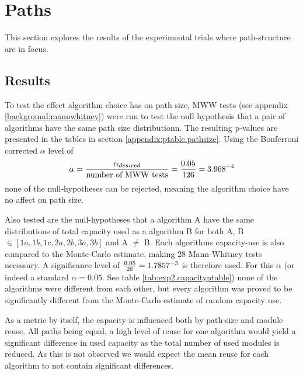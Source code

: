 \section{Paths}
This section explores the results of the experimental trials where path-structure are in focus. 

\subsection{Results}
To test the effect algorithm choice has on path size, MWW tests (see appendix \ref{background:mannwhitney}) were run to test the null hypothesis that a pair of algorithms have the same path size distributionn. The resulting p-values are presented in the tables in section \ref{appendix:ptable.pathsize}. Using the Bonferroni corrected \(\alpha\) level of 
\begin{equation*}
    \alpha=\frac{\alpha_{desired}}{\text{number of MWW tests}}=\frac{0.05}{126}=3.968\time 10^{-4}
\end{equation*}
none of the null-hypotheses can be rejected, meaning the algorithm choice have no affect on path size. 

Also tested are the null-hypotheses that a algorithm A have the same distributions of total capacity used as a algorithm B for both A, B \(\in [1a, 1b, 1c, 2a, 2b, 3a, 3b]\) and A \(\neq\) B. Each algorithms capacity-use is also compared to the Monte-Carlo estimate, making 28 Mann-Whitney tests necessary. A significance level of \(\frac{0.05}{28}=1.7857\time 10^{-3}\) is therefore used. For this \(\alpha\) (or indeed a standard \(\alpha=0.05\). See table \ref{tab:exp2.capacityptable}) none of the algorithms were different from each other, but every algorithm was proved to be significantly different from the Monte-Carlo estimate of random capacity use. 

As a metric by itself, the capacity is influenced both by path-size and module reuse. All paths being equal, a high level of reuse for one algorithm would yield a significant difference in used capacity as the total number of used modules is reduced. As this is not observed we would expect the mean reuse for each algorithm to not contain significant differences.

